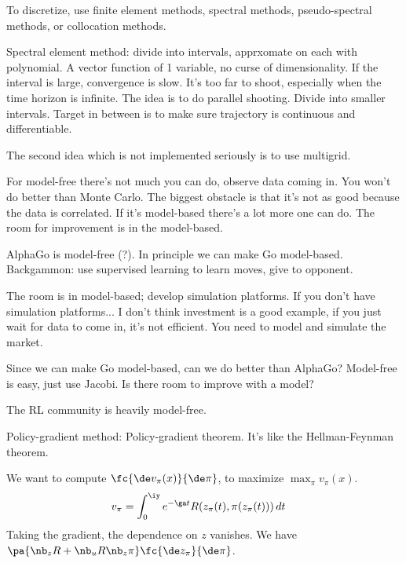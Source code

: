 To discretize, use finite element methods, spectral methods, pseudo-spectral methods, or collocation methods. 

Spectral element method: divide into intervals, apprxomate on each with polynomial. A vector function of 1 variable, no curse of dimensionality. If the interval is large, convergence is slow. It's too far to shoot, especially when the time horizon is infinite. 
The idea is to do parallel shooting. Divide into smaller intervals. Target in between is to make sure trajectory is continuous and differentiable. 

The second idea which is not implemented seriously is to use multigrid. 

For model-free there's not much you can do, observe data coming in. You won't do better than Monte Carlo. The biggest obstacle is that it's not as good because the data is correlated.  If it's model-based there's a lot more one can do. The room for improvement is in the model-based.

AlphaGo is model-free (?). In principle we can make Go model-based. %
Backgammon: use supervised learning to learn moves, give to opponent.

The room is in model-based; develop simulation platforms. If you don't have simulation platforms... I don't think investment is a good example, if you just wait for data to come in, it's not efficient. You need to model and simulate the market. 

Since we can make Go model-based, can we do better than AlphaGo? Model-free is easy, just use Jacobi. Is there room to improve with a model?

The RL community is heavily model-free. 

Policy-gradient method: Policy-gradient theorem. It's like the Hellman-Feynman theorem.

We want to compute $\fc{\de v_\pi(x)}{\de \pi}$, to maximize $\max_\pi v_\pi(x)$. 
\begin{align}
v_\pi &= \int_0^\iy e^{-\ga t} R(z_\pi(t),\pi(z_\pi(t)))\,dt
\end{align}
Taking the gradient, the dependence on $z$ vanishes. We have $\pa{\nb_z R + \nb_u R\nb_z\pi}\fc{\de z_\pi}{\de\pi}$.
 
